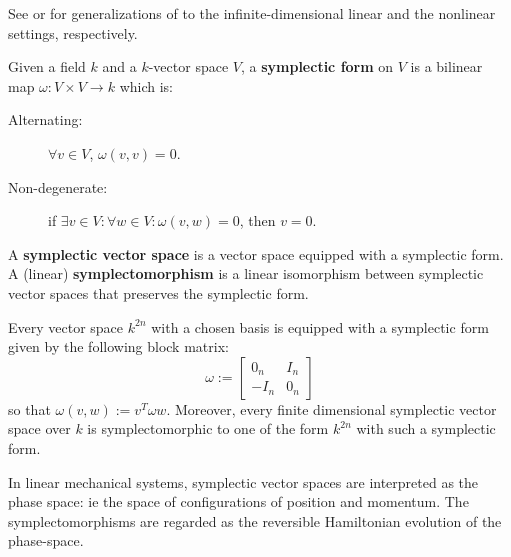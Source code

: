See \cite{Weinstein2017} or  \cite{weinsteinsymplectic} for generalizations of to the infinite-dimensional linear and the nonlinear settings, respectively.
\begin{definition}
  Given a field  $k$ and a $k$-vector space $V$, a {\bf symplectic form} on $V$ is a bilinear map $\omega:V\times V\to k$ which is:
\begin{description}
 \item[Alternating:] $\forall v \in V$, $\omega(v,v)=0$.
 \item[Non-degenerate:] if $\exists v \in V: \forall w \in V: \omega(v,w)=0$, then $v=0$.
\end{description}
  A {\bf symplectic vector space} is a vector space equipped with a symplectic form. A (linear) {\bf symplectomorphism} is a linear isomorphism between symplectic vector spaces that preserves the symplectic form.
\end{definition}
\begin{lemma}
\label{lemma:sform}
Every vector space $k^{2n}$ with a chosen basis is equipped with a symplectic form given by the following block matrix:
$$
\omega:=
\begin{bmatrix}
0_n & I_n\\
-I_n & 0_n
\end{bmatrix}
$$
so that $\omega(v,w) := v^T \omega w$.
Moreover, every finite dimensional symplectic vector space over $k$ is symplectomorphic to one of the form $k^{2n}$ with such a symplectic form.
\end{lemma}

In linear mechanical systems, symplectic vector spaces are interpreted as  the phase space: ie the space of configurations of position and momentum.  The symplectomorphisms are regarded as the reversible Hamiltonian evolution of the phase-space.

